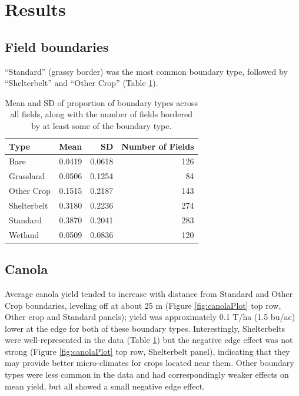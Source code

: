 \documentclass[]{elsarticle} %
\begin{document}
\hypertarget{results}{%
\section{Results}\label{results}}

\hypertarget{field-boundaries}{%
\subsection{Field boundaries}\label{field-boundaries}}

``Standard'' (grassy border) was the most common boundary type, followed by ``Shelterbelt'' and ``Other Crop'' (Table \ref{tab:boundaryTypes}).

\begin{table}

\caption{\label{tab:boundaryTypes}Mean and SD of proportion of boundary types across all fields, along with the number of fields bordered by at least some of the boundary type.}
\centering
\begin{tabular}[t]{l|r|r|r}
\hline
Type & Mean & SD & Number of Fields\\
\hline
Bare & 0.0419 & 0.0618 & 126\\
\hline
Grassland & 0.0506 & 0.1254 & 84\\
\hline
Other Crop & 0.1515 & 0.2187 & 143\\
\hline
Shelterbelt & 0.3180 & 0.2236 & 274\\
\hline
Standard & 0.3870 & 0.2041 & 283\\
\hline
Wetland & 0.0509 & 0.0836 & 120\\
\hline
\end{tabular}
\end{table}

\hypertarget{canola}{%
\subsection{Canola}\label{canola}}

Average canola yield tended to increase with distance from Standard and Other Crop boundaries, leveling off at about 25 m (Figure \ref{fig:canolaPlot} top row, Other crop and Standard panels); yield was approximately 0.1 T/ha (1.5 bu/ac) lower at the edge for both of these boundary types.
Interestingly, Shelterbelts were well-represented in the data (Table \ref{tab:boundaryTypes}) but the negative edge effect was not strong (Figure \ref{fig:canolaPlot} top row, Shelterbelt panel), indicating that they may provide better micro-climates for crops located near them.
Other boundary types were less common in the data and had correspondingly weaker effects on mean yield, but all showed a small negative edge effect.
\end{document}
